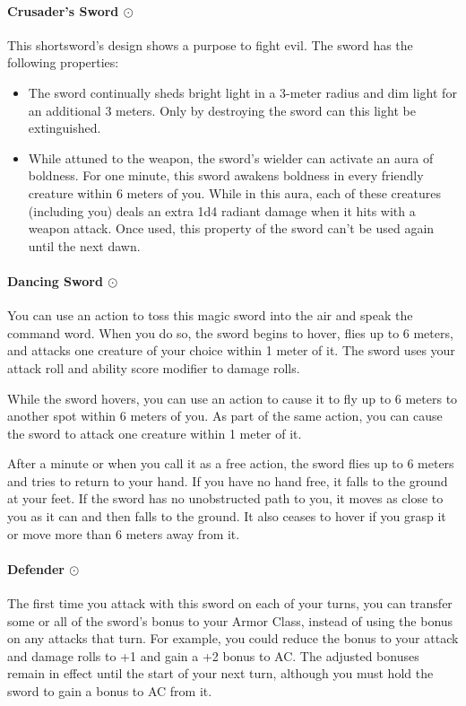     \paragraph{Crusader's Sword $\odot$}
        This shortsword's design shows a purpose to fight evil.
        The sword has the following properties:
        \begin{itemize}
            \item The sword continually sheds bright light in a 3-meter radius and dim light for an additional 3 meters.
            Only by destroying the sword can this light be extinguished.
            \item While attuned to the weapon, the sword's wielder can activate an aura of boldness.
            For one minute, this sword awakens boldness in every friendly creature within 6 meters of you.
            While in this aura, each of these creatures (including you) deals an extra 1d4 radiant damage when it hits with a weapon attack.
            Once used, this property of the sword can't be used again until the next dawn.
        \end{itemize}
    \paragraph{Dancing Sword $\odot$}
        You can use an action to toss this magic sword into the air and speak the command word.
        When you do so, the sword begins to hover, flies up to 6 meters, and attacks one creature of your choice within 1 meter of it.
        The sword uses your attack roll and ability score modifier to damage rolls.

        While the sword hovers, you can use an action to cause it to fly up to 6 meters to another spot within 6 meters of you.
        As part of the same action, you can cause the sword to attack one creature within 1 meter of it.

        After a minute or when you call it as a free action, the sword flies up to 6 meters and tries to return to your hand.
        If you have no hand free, it falls to the ground at your feet.
        If the sword has no unobstructed path to you, it moves as close to you as it can and then falls to the ground.
        It also ceases to hover if you grasp it or move more than 6 meters away from it.
    \paragraph{Defender $\odot$}
        The first time you attack with this sword on each of your turns, you can transfer some or all of the sword's bonus to your Armor Class, instead of using the bonus on any attacks that turn.
        For example, you could reduce the bonus to your attack and damage rolls to +1 and gain a +2 bonus to AC.
        The adjusted bonuses remain in effect until the start of your next turn, although you must hold the sword to gain a bonus to AC from it.
